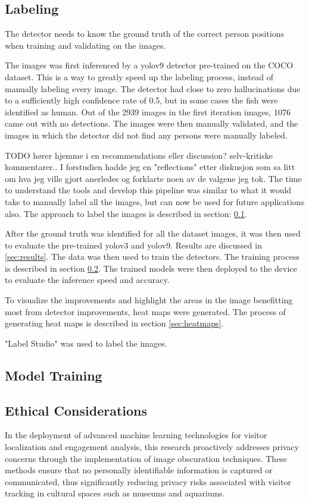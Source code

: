 \subsection{Labeling}
\label{sec:labeling}
The detector needs to know the ground truth of the correct person positions when training and validating on the images. 

The images was first inferenced by a yolov9 detector pre-trained on the COCO dataset. This is a way to greatly speed up the labeling process, instead of manually labeling every image. The detector had close to zero hallucinations due to a sufficiently high confidence rate of 0.5, but in some cases the fish were identified as human. Out of the 2939 images in the first iteration images, 1076 came out with no detections. The images were then manually validated, and the images in which the detector did not find any persons were manually labeled. 

TODO hører hjemme i en recommendations eller discussion? selv-kritiske kommentarer.. I forstudien hadde jeg en "reflections" etter diskusjon som sa litt om hva jeg ville gjort anerledes og forklarte noen av de valgene jeg tok. 
The time to understand the tools and develop this pipeline was similar to what it would take to manually label all the images, but can now be used for future applications also. The approach to label the images is described in section: \ref{sec:labeling}.

After the ground truth was identified for all the dataset images, it was then used to evaluate the pre-trained yolov3 and yolov9. Results are discussed in \ref{sec:results}. The data was then used to train the detectors. The training process is described in section \ref{sec:model_training}. The trained models were then deployed to the device to evaluate the inference speed and accuracy.

To visualize the improvements and highlight the areas in the image benefitting most from detector improvements, heat maps were generated. The process of generating heat maps is described in section \ref{sec:heatmaps}.


"Label Studio" was used to label the images. 

\subsection{Model Training}
\label{sec:model_training}

\subsection{Ethical Considerations}
In the deployment of advanced machine learning technologies for visitor localization and engagement analysis, this research proactively addresses privacy concerns through the implementation of image obscuration techniques. These methods ensure that no personally identifiable information is captured or communicated, thus significantly reducing privacy risks associated with visitor tracking in cultural spaces such as museums and aquariums.

